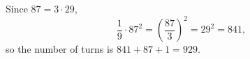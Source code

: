 Since $87=3\cdot29$,
\[\dfrac19\cdot87^2=\left(\dfrac{87}{3}\right)^2=29^2=841,\]
so the number of turns is $841+87+1=\boxed{929}$.
